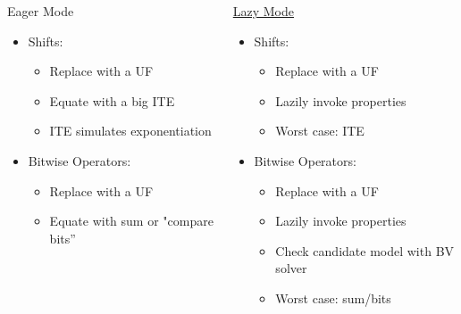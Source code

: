 \documentclass[t,aspectratio=43,9pt,bookmarks=false,dvipsnames,table]{beamer}
\begin{document}
\begin{frame}[t]
  \begin{block}{}
  \begin{columns}
  \begin{alertblock}{Eager Mode}
      \begin{itemize}
      \item Shifts:
        \begin{itemize}
          \item Replace with a UF
          \item Equate with a big ITE
          \item ITE simulates exponentiation
        \end{itemize}
      \item Bitwise Operators:
        \begin{itemize}
            \item Replace with a UF
            \item Equate with sum or "compare bits''
         \end{itemize}
      \end{itemize}
  \end{alertblock}
  \begin{alertblock}{\underline{Lazy Mode}}
    \begin{itemize}
      \item Shifts:
        \begin{itemize}
          \item Replace with a UF
          \item Lazily invoke properties
          \item Worst case: ITE
        \end{itemize}
      \item Bitwise Operators:
        \begin{itemize}
        \item Replace with a UF
        \item Lazily invoke properties
        \item Check candidate model with BV solver
        \item Worst case: sum/bits
        \end{itemize}
                \end{itemize}
  \end{alertblock}
  \end{columns}
\end{block}
\end{frame}
\end{document}
